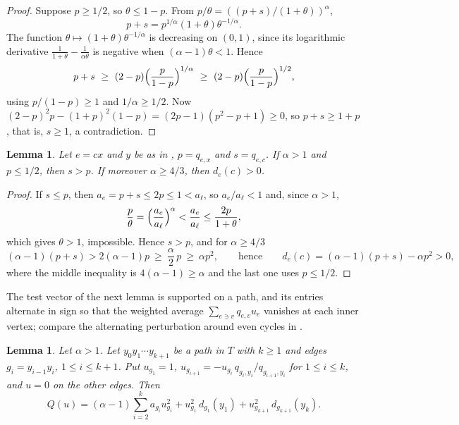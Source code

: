 \documentclass[11pt]{article}
\newtheorem{lemma}[theorem]{Lemma}
\theoremstyle{definition}
\theoremstyle{remark}
\begin{document}
\begin{proof}
Suppose $p\ge 1/2$, so $\theta\le 1-p$. From $p/\theta=((p+s)/(1+\theta))^\alpha$,
\[
  p+s=p^{1/\alpha}(1+\theta)\theta^{-1/\alpha}.
\]
The function $\theta\mapsto(1+\theta)\theta^{-1/\alpha}$ is decreasing on $(0,1)$, since its logarithmic derivative
$\frac1{1+\theta}-\frac1{\alpha \theta}$ is negative when $(\alpha-1)\theta<1$. Hence
\[
  p+s\ \ge\ (2-p)\Bigl(\frac p{1-p}\Bigr)^{1/\alpha}\ \ge\ (2-p)\Bigl(\frac p{1-p}\Bigr)^{1/2},
\]
using $p/(1-p)\ge 1$ and $1/\alpha\ge 1/2$. Now
$(2-p)^2p-(1+p)^2(1-p)=(2p-1)(p^2-p+1)\ge 0$, so $p+s\ge 1+p$, that is, $s\ge 1$, a contradiction.
\end{proof}

\begin{lemma}\label{lem:A}
Let $e=cx$ and $y$ be as in , $p=q_{e,x}$ and $s=q_{e,c}$. If $\alpha>1$ and $p\le 1/2$, then $s>p$. If moreover
$\alpha\ge 4/3$, then $d_e(c)>0$.
\end{lemma}

\begin{proof}
If $s\le p$, then $a_e=p+s\le 2p\le 1<a_{\ell}$, so $a_e/a_{\ell}<1$ and, since $\alpha>1$,
\[
  \frac p\theta =\Bigl(\frac{a_e}{a_{\ell}}\Bigr)^\alpha<\frac{a_e}{a_{\ell}}\le\frac{2p}{1+\theta},
\]
which gives $\theta>1$, impossible. Hence $s>p$, and for $\alpha\ge 4/3$
\[
  (\alpha-1)(p+s)>2(\alpha-1)p\ \ge\ \frac\alpha2\,p\ \ge\ \alpha p^2,\qquad\text{hence}\qquad
  d_e(c)=(\alpha-1)(p+s)-\alpha p^2>0,
\]
where the middle inequality is $4(\alpha-1)\ge\alpha$ and the last one uses $p\le 1/2$.
\end{proof}

The test vector of the next lemma is supported on a path, and its entries alternate in sign so that the weighted
average $\sum_{e\ni v}q_{e,v}u_e$ vanishes at each inner vertex; compare the alternating perturbation around even
cycles in \cite[Lemma~2]{HHK}.

\begin{lemma}\label{lem:path}
Let $\alpha>1$. Let $y_0y_1\cdots y_{k+1}$ be a path in $T$ with $k\ge 1$ and edges $g_i=y_{i-1}y_i$, $1\le i\le k+1$. Put
$u_{g_1}=1$, $u_{g_{i+1}}=-u_{g_i}\,q_{g_i,y_i}/q_{g_{i+1},y_i}$ for $1\le i\le k$, and $u=0$ on the other edges.
Then
\[
  Q(u)=(\alpha-1)\sum_{i=2}^{k}a_{g_i}u_{g_i}^2+u_{g_1}^2\,d_{g_1}(y_1)+u_{g_{k+1}}^2\,d_{g_{k+1}}(y_k).
\]
\end{lemma}
\end{document}
